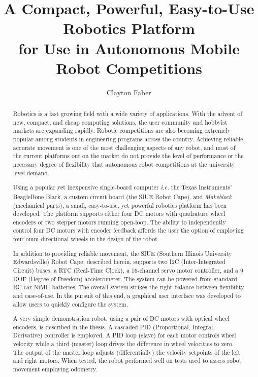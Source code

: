 \documentclass[12pt,oneside,final]{siuethesis}
\author{Clayton Faber}
\title{A Compact, Powerful, Easy-to-Use Robotics Platform \protect\\
for Use in Autonomous Mobile Robot Competitions }
\theoremstyle{definition}
\begin{document}
\maketitle 

\frontmatter %

\copyrightpage %

\begin{abstract}

Robotics is a fast growing field with a wide variety of applications. With the advent of new, compact, and cheap computing solutions, the user community and hobbyist markets are expanding rapidly. Robotic competitions are also becoming extremely popular among students in engineering programs across the country. Achieving reliable, accurate movement is one of the most challenging aspects of any robot, and most of the current platforms out on the market do not provide the level of performance or the necessary degree of flexibility that autonomous robot competitions at the university level demand. 

Using a popular yet inexpensive single-board computer \emph{i.e.} the Texas Instruments' BeagleBone Black, a custom circuit board (the SIUE Robot Cape), and \emph{Makeblock}\textsuperscript{\textregistered} (mechanical parts), a small, easy-to-use, yet powerful robotics platform has been developed. The platform supports either four DC motors with quadrature wheel encoders or two stepper motors running open-loop. The ability to independently control four DC motors with encoder feedback affords the user the option of employing four omni-directional wheels in the design of the robot.

In addition to providing reliable movement, the SIUE (Southern Illinois University Edwardsville) Robot Cape, described herein, supports two I2C (Inter-Integrated Circuit) buses, a RTC (Real-Time Clock), a 16-channel servo motor controller, and a 9 DOF (Degree of Freedom) accelerometer. The system can be powered from standard RC car NiMH batteries.  The overall system strikes the right balance between flexibility and ease-of-use. In the pursuit of this end, a graphical user interface was developed to allow users to quickly configure the system.

A very simple demonstration robot, using a pair of DC motors with optical wheel encoders, is described in the thesis. A cascaded PID (Proportional, Integral, Derivative) controller is employed.  A PID loop (slave) for each motor controls wheel velocity while a third (master) loop drives the difference in wheel velocities to zero. The output of the master loop adjusts (differentially) the velocity setpoints of the left and right motors. When tested, the robot performed well on tests used to assess robot movement employing odometry.

\end{abstract}
\end{document}
